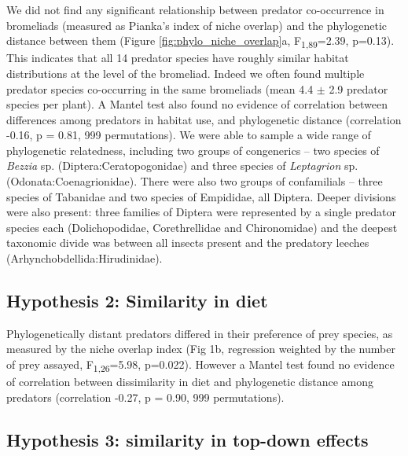 \documentclass[11pt]{article}
\begin{document}
We did not find any significant relationship between predator
co-occurrence in bromeliads (measured as Pianka's index of niche
overlap) and the phylogenetic distance between them (Figure \ref{fig:phylo_niche_overlap}a,
F\textsubscript{1,89}=2.39, p=0.13). This indicates that all 14 predator
species have roughly similar habitat distributions at the level of the
bromeliad. Indeed we often found multiple predator species co-occurring
in the same bromeliads (mean 4.4 $\pm$ 2.9 predator species per plant). A
Mantel test also found no evidence of correlation between differences
among predators in habitat use, and phylogenetic distance (correlation
-0.16, p = 0.81, 999 permutations). We were able to sample a wide range
of phylogenetic relatedness, including two groups of congenerics -- two
species of \emph{Bezzia} sp. (Diptera:Ceratopogonidae) and three species
of \emph{Leptagrion} sp. (Odonata:Coenagrionidae). There were also two
groups of confamilials -- three species of Tabanidae and two species of
Empididae, all Diptera. Deeper divisions were also present: three
families of Diptera were represented by a single predator species each
(Dolichopodidae, Corethrellidae and Chironomidae) and the deepest
taxonomic divide was between all insects present and the predatory
leeches (Arhynchobdellida:Hirudinidae).

\subsection*{Hypothesis 2: Similarity in diet}

Phylogenetically distant predators differed in their preference of prey
species, as measured by the niche overlap index (Fig 1b, regression
weighted by the number of prey assayed, F\textsubscript{1,26}=5.98,
p=0.022). However a Mantel test found no evidence of correlation between
dissimilarity in diet and phylogenetic distance among predators
(correlation -0.27, p = 0.90, 999 permutations).

\subsection*{Hypothesis 3: similarity in top-down effects}
\end{document}
